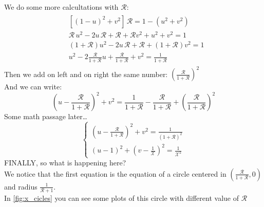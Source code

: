 We do some more calcultations with $\mathcal{R}$:
\begin{align}
    \begin{split}
        &[(1-u)^2+v^2]\,\mathcal{R}=1-(u^2+v^2)\\[5pt]
        &\mathcal{R}\, u^2 -2 u\, \mathcal{R} + \mathcal{R} + \mathcal{R} v^2 +u^2+v^2=1\\[5pt]
        &(1+\mathcal{R})u^2-2u\,\mathcal{R}+\mathcal{R}+(1+\mathcal{R})v^2=1\\[5pt]
        &u^2-2\frac{\mathcal{R}}{1+\mathcal{R}}u+\frac{\mathcal{R}}{1+\mathcal{R}}+v^2=\frac{1}{1+\mathcal{R}}
    \end{split}
\end{align}
Then we add on left and on right the same number: $\left(\frac{\mathcal{R}}{1+\mathcal{R}}\right)^2$\\
And we can write:
\begin{equation}
    \left(u-\frac{\mathcal{R}}{1+\mathcal{R}}\right)^2+v^2=\frac{1}{1+\mathcal{R}} - \frac{\mathcal{R}}{1+\mathcal{R}}+\left(\frac{\mathcal{R}}{1+\mathcal{R}}\right)^2
\end{equation}
Some math passage later\dots
\begin{equation}
    \begin{cases}
        \left(u-\frac{\mathcal{R}}{1+\mathcal{R}}\right)^2+v^2 =\frac{1}{(1+\mathcal{R})^2}\\
        (u-1)^2+\left(v-\frac{1}{\mathcal{X}}\right)^2=\frac{1}{\mathcal{X}^2}
    \end{cases}
\end{equation}
FINALLY, so what is happening here?\\
We notice that the first equation is the equation of a circle centered in $\left(\frac{\mathcal{R}}{1+\mathcal{R}},0\right)$ and radius $\frac{1}{\mathcal{R}+1}$.\\
In \cref{fig:x_cicles} you can see some plots of this circle with different value of $\mathcal{R}$
